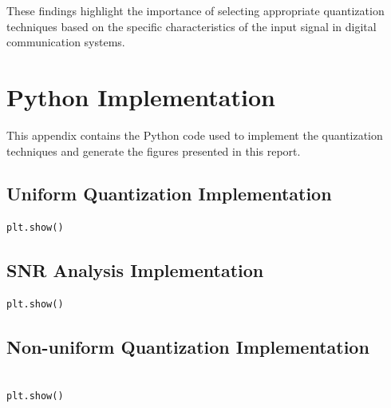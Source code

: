 \documentclass{article}
\begin{document}
These findings highlight the importance of selecting appropriate quantization techniques based on the specific characteristics of the input signal in digital communication systems.

\appendix

\section{Python Implementation}

\label{appendix:code}

This appendix contains the Python code used to implement the quantization techniques and generate the figures presented in this report.

\subsection{Uniform Quantization Implementation}

\begin{lstlisting}[language=Python, caption=Uniform Quantization Implementation]
plt.show()
\end{lstlisting}

\subsection{SNR Analysis Implementation}

\begin{lstlisting}[language=Python, caption=SNR Analysis Implementation]
plt.show()
\end{lstlisting}

\subsection{Non-uniform Quantization Implementation}

\begin{lstlisting}[language=Python, caption=Non-uniform Quantization and Companding Implementation]

plt.show()
\end{lstlisting}
\end{document}
